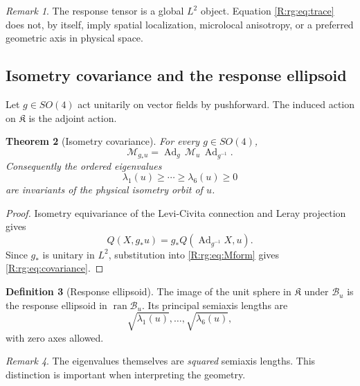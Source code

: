 \documentclass[
 aps,
 prd,
 reprint,
 amsmath,
 amssymb,
 nofootinbib,
 superscriptaddress
]{revtex4-2}
\newtheorem{theorem}{Theorem}[section]
\theoremstyle{definition}
\newtheorem{definition}[theorem]{Definition}
\theoremstyle{remark}
\newtheorem{remark}[theorem]{Remark}
\newcommand{\cM}{\mathscr M}
\newcommand{\cB}{\mathscr B}
\begin{document}
\begin{remark}
The response tensor is a global $L^2$ object.  Equation
\eqref{R:rg:eq:trace} does not, by itself, imply spatial localization,
microlocal anisotropy, or a preferred geometric axis in physical space.
\end{remark}

\subsection{Isometry covariance and the response ellipsoid}

Let $g\in SO(4)$ act unitarily on vector fields by pushforward.  The induced
action on $\mathfrak K$ is the adjoint action.

\begin{theorem}[Isometry covariance]
\label{R:rg:thm:covariance}
For every $g\in SO(4)$,
\begin{equation}
 \cM_{g_*u}
 =
 \operatorname{Ad}_g\,
 \cM_u\,
 \operatorname{Ad}_{g^{-1}}.
 \label{R:rg:eq:covariance}
\end{equation}
Consequently the ordered eigenvalues
\begin{equation}
 \lambda_1(u)\ge\cdots\ge\lambda_6(u)\ge0
 \label{R:rg:eq:eigenvalues}
\end{equation}
are invariants of the physical isometry orbit of $u$.
\end{theorem}

\begin{proof}
Isometry equivariance of the Levi-Civita connection and Leray projection
gives
\[
 Q(X,g_*u)
 =
 g_*Q(\operatorname{Ad}_{g^{-1}}X,u).
\]
Since $g_*$ is unitary in $L^2$, substitution into \eqref{R:rg:eq:Mform} gives
\eqref{R:rg:eq:covariance}.
\end{proof}

\begin{definition}[Response ellipsoid]
The image of the unit sphere in $\mathfrak K$ under $\cB_u$ is the response
ellipsoid in $\operatorname{ran}\cB_u$.  Its principal semiaxis lengths are
\begin{equation}
        \sqrt{\lambda_1(u)},\ldots,\sqrt{\lambda_6(u)},
 \label{R:rg:eq:axes}
\end{equation}
with zero axes allowed.
\end{definition}

\begin{remark}
The eigenvalues themselves are \emph{squared} semiaxis lengths.  This
distinction is important when interpreting the geometry.
\end{remark}
\end{document}
